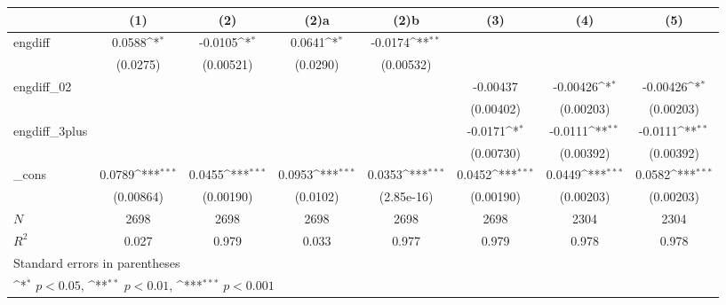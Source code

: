 {
\def\sym#1{\ifmmode^{#1}\else\(^{#1}\)\fi}
\begin{tabular}{l*{7}{c}}
\hline\hline
            &\multicolumn{1}{c}{(1)}&\multicolumn{1}{c}{(2)}&\multicolumn{1}{c}{(2)a}&\multicolumn{1}{c}{(2)b}&\multicolumn{1}{c}{(3)}&\multicolumn{1}{c}{(4)}&\multicolumn{1}{c}{(5)}\\
\hline
engdiff     &      0.0588\sym{*}  &     -0.0105\sym{*}  &      0.0641\sym{*}  &     -0.0174\sym{**} &                     &                     &                     \\
            &    (0.0275)         &   (0.00521)         &    (0.0290)         &   (0.00532)         &                     &                     &                     \\
[1em]
engdiff\_02  &                     &                     &                     &                     &    -0.00437         &    -0.00426\sym{*}  &    -0.00426\sym{*}  \\
            &                     &                     &                     &                     &   (0.00402)         &   (0.00203)         &   (0.00203)         \\
[1em]
engdiff\_3plus&                     &                     &                     &                     &     -0.0171\sym{*}  &     -0.0111\sym{**} &     -0.0111\sym{**} \\
            &                     &                     &                     &                     &   (0.00730)         &   (0.00392)         &   (0.00392)         \\
[1em]
\_cons      &      0.0789\sym{***}&      0.0455\sym{***}&      0.0953\sym{***}&      0.0353\sym{***}&      0.0452\sym{***}&      0.0449\sym{***}&      0.0582\sym{***}\\
            &   (0.00864)         &   (0.00190)         &    (0.0102)         &  (2.85e-16)         &   (0.00190)         &   (0.00203)         &   (0.00203)         \\
\hline
\(N\)       &        2698         &        2698         &        2698         &        2698         &        2698         &        2304         &        2304         \\
\(R^{2}\)   &       0.027         &       0.979         &       0.033         &       0.977         &       0.979         &       0.978         &       0.978         \\
\hline\hline
\multicolumn{8}{l}{\footnotesize Standard errors in parentheses}\\
\multicolumn{8}{l}{\footnotesize \sym{*} \(p<0.05\), \sym{**} \(p<0.01\), \sym{***} \(p<0.001\)}\\
\end{tabular}
}
